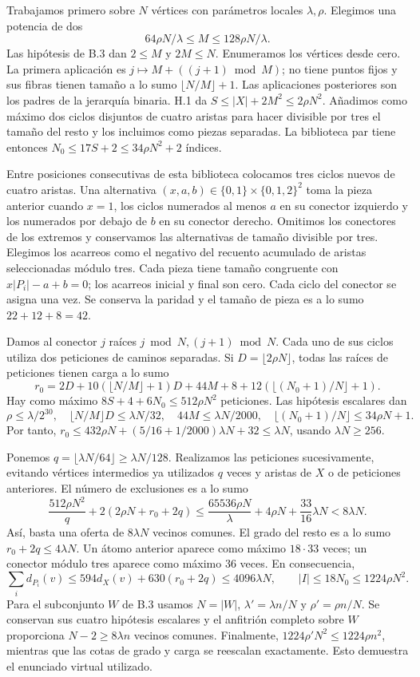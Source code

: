 \documentclass[spanish,11pt,a4paper]{article}
\begin{document}
Trabajamos primero sobre \(N\) vértices con parámetros locales \(\lambda,\rho\). Elegimos una potencia de dos \[64\rho N/\lambda\le M\le128\rho N/\lambda.\] Las hipótesis de B.3 dan \(2\le M\) y \(2M\le N\). Enumeramos los vértices desde cero. La primera aplicación es \(j\mapsto M+((j+1)\bmod M)\); no tiene puntos fijos y sus fibras tienen tamaño a lo sumo \(\lfloor N/M\rfloor+1\). Las aplicaciones posteriores son los padres de la jerarquía binaria. H.1 da \(S\le|X|+2M^2\le2\rho N^2\). Añadimos como máximo dos ciclos disjuntos de cuatro aristas para hacer divisible por tres el tamaño del resto y los incluimos como piezas separadas. La biblioteca par tiene entonces \(N_0\le17S+2\le34\rho N^2+2\) índices.

Entre posiciones consecutivas de esta biblioteca colocamos tres ciclos nuevos de cuatro aristas. Una alternativa \((x,a,b)\in\{0,1\}\times\{0,1,2\}^2\) toma la pieza anterior cuando \(x=1\), los ciclos numerados al menos \(a\) en su conector izquierdo y los numerados por debajo de \(b\) en su conector derecho. Omitimos los conectores de los extremos y conservamos las alternativas de tamaño divisible por tres. Elegimos los acarreos como el negativo del recuento acumulado de aristas seleccionadas módulo tres. Cada pieza tiene tamaño congruente con \(x|P_i|-a+b=0\); los acarreos inicial y final son cero. Cada ciclo del conector se asigna una vez. Se conserva la paridad y el tamaño de pieza es a lo sumo \(22+12+8=42\).

Damos al conector \(j\) raíces \(j\bmod N,(j+1)\bmod N\). Cada uno de sus ciclos utiliza dos peticiones de caminos separadas. Si \(D=\lfloor2\rho N\rfloor\), todas las raíces de peticiones tienen carga a lo sumo \[r_0=2D+10(\lfloor N/M\rfloor+1)D+44M+8
+12(\lfloor(N_0+1)/N\rfloor+1).\] Hay como máximo \(8S+4+6N_0\le512\rho N^2\) peticiones. Las hipótesis escalares dan \[\rho\le\lambda/2^{30},\quad
\lfloor N/M\rfloor D\le\lambda N/32,\quad
44M\le\lambda N/2000,\quad
\lfloor(N_0+1)/N\rfloor\le34\rho N+1.\] Por tanto, \(r_0\le432\rho N+(5/16+1/2000)\lambda N+32\le\lambda N\), usando \(\lambda N\ge256\).

Ponemos \(q=\lfloor\lambda N/64\rfloor\ge\lambda N/128\). Realizamos las peticiones sucesivamente, evitando vértices intermedios ya utilizados \(q\) veces y aristas de \(X\) o de peticiones anteriores. El número de exclusiones es a lo sumo \[\frac{512\rho N^2}{q}+2(2\rho N+r_0+2q)
\le\frac{65536\rho N}{\lambda}+4\rho N+\frac{33}{16}\lambda N
<8\lambda N.\] Así, basta una oferta de \(8\lambda N\) vecinos comunes. El grado del resto es a lo sumo \(r_0+2q\le4\lambda N\). Un átomo anterior aparece como máximo \(18\cdot33\) veces; un conector módulo tres aparece como máximo \(36\) veces. En consecuencia, \[\sum_i d_{P_i}(v)\le594d_X(v)+630(r_0+2q)\le4096\lambda N,
\qquad |I|\le18N_0\le1224\rho N^2.\] Para el subconjunto \(W\) de B.3 usamos \(N=|W|\), \(\lambda'=\lambda n/N\) y \(\rho'=\rho n/N\). Se conservan sus cuatro hipótesis escalares y el anfitrión completo sobre \(W\) proporciona \(N-2\ge8\lambda n\) vecinos comunes. Finalmente, \(1224\rho'N^2\le1224\rho n^2\), mientras que las cotas de grado y carga se reescalan exactamente. Esto demuestra el enunciado virtual utilizado.
\end{document}
